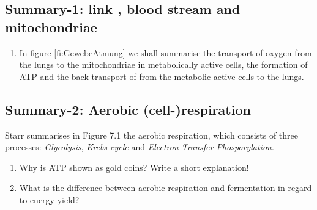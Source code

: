 \clearpage
\subsection{Summary-1: link  , blood stream and mitochondriae}

\begin{enumerate}[resume, leftmargin=*]
\item  In figure \ref{fi:GewebeAtmung} we shall summarise the transport of oxygen from the lungs to the mitochondriae in metabolically active cells, the formation of ATP and the back-transport of   from the metabolic active cells to the lungs.
\end{enumerate}

\vspace{1cm}	\enlargethispage{2cm}		      
\subsection{Summary-2: Aerobic (cell-)respiration}
		\begin{mdframed}[style=exampledefault, userdefinedwidth=12cm,frametitle={Starr, chapter 7.1}\label{mat:BEISPIELMATERIAL}]	  
			 Starr summarises in  Figure 7.1 the aerobic respiration, which consists of three processes: \emph{Glycolysis}, \emph{Krebs cycle} and \emph{Electron Transfer Phosporylation}.
		\end{mdframed}

\begin{enumerate}[resume, leftmargin=*]
	\item  Why is ATP shown as gold coins? Write a short explanation!\\
	
	\item What is the difference between aerobic respiration and fermentation in regard to energy yield? \\
\end{enumerate}
		
